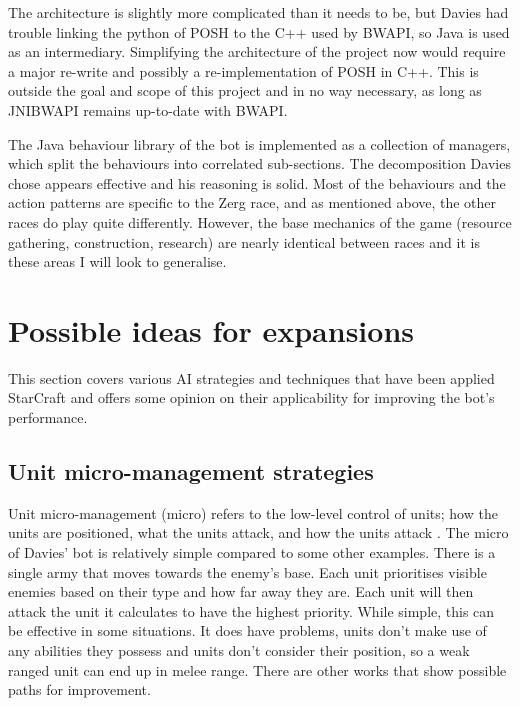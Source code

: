 \documentclass[11pt,openright,a4paper]{report}
\begin{document}
The architecture is slightly more complicated than it needs to be, but Davies had trouble linking the python of POSH to the C++ used by BWAPI, so Java is used as an intermediary. Simplifying the architecture of the project now would require a major re-write and possibly a re-implementation of POSH in C++. This is outside the goal and scope of this project and in no way necessary, as long as JNIBWAPI remains up-to-date with BWAPI.

\label{LitSrvyClass}
The Java behaviour library of the bot is implemented as a collection of managers, which split the behaviours into correlated sub-sections. The decomposition Davies chose appears effective and his reasoning is solid.  Most of the behaviours and the action patterns are specific to the Zerg race, and as mentioned above, the other races do play quite differently. However, the base mechanics of the game (resource gathering, construction, research) are nearly identical between races and it is these areas I will look to generalise.

\section{Possible ideas for expansions}
This section covers various AI strategies and techniques that have been applied StarCraft and offers some opinion on their applicability for improving the bot's performance.

\subsection{Unit micro-management strategies}
Unit micro-management (micro) refers to the low-level control of units; how the units are positioned, what the units attack, and how the units attack \cite{TLMicro}.
The micro of Davies' bot is relatively simple compared to some other examples. There is a single army that moves towards the enemy's base. Each unit prioritises visible enemies based on their type and how far away they are. Each unit will then attack the unit it calculates to have the highest priority. While simple, this can be effective in some situations. It does have problems, units don't make use of any abilities they possess and units don't consider their position, so a weak ranged unit can end up in melee range. There are other works that show possible paths for improvement.
\end{document}
